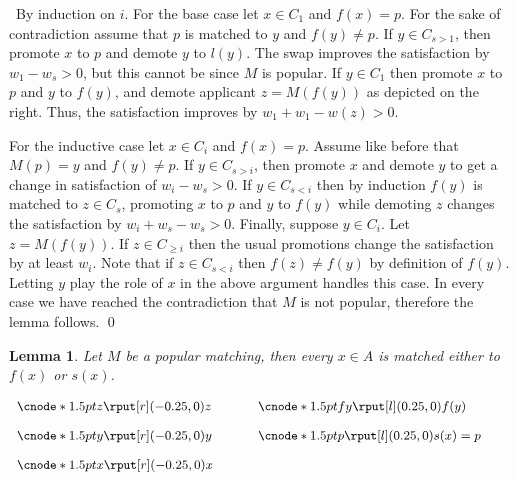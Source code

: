 \documentclass[11pt]{article}
\newcommand{\first}{f}
\newcommand{\second}{s}
\newtheorem{lemma}{Lemma}
\begin{document}
\newcommand\myproof{ ~}
\myproof By induction on $i$. For the base case let $x \in C_1$ and $\first(x)=p$. For the sake of contradiction assume that $p$ is matched to $y$ and $\first(y) \neq p$. If $y \in C_{s>1}$, then promote $x$ to $p$ and demote $y$ to $l(y)$. The swap improves the satisfaction by $w_1 - w_s > 0$, but this cannot be since $M$ is popular. If $y \in C_1$ then promote $x$ to $p$ and $y$ to $\first(y)$, and demote applicant $z = M(\first(y))$ as depicted on the right. Thus, the satisfaction improves by $w_1 + w_1 - w(z) > 0$. 

For the inductive case let $x \in C_i$ and $\first(x) = p$. Assume like before that $M(p)=y$ and $\first(y) \neq p$. If $y \in C_{s>i}$, then promote $x$ and demote $y$ to get a change in satisfaction of $w_i - w_s > 0$. If $y \in C_{s<i}$ then by induction $\first(y)$ is matched to $z \in C_s$, promoting $x$ to $p$ and  $y$ to $\first(y)$ while demoting $z$ changes the satisfaction by $w_i + w_s - w_s > 0$. Finally, suppose $y \in C_i$. Let $z = M(\first(y))$. If $z \in C_{\geq  i}$ then the usual promotions change the satisfaction by at least $w_i$. Note that if $z \in C_ {s < i}$ then $\first(z) \neq \first(y)$ by definition of $\first(y)$. Letting $y$ play the role of $x$ in the above argument handles this case.
In every case we have reached the contradiction that $M$ is not popular, therefore the lemma follows.
\qed \\

\begin{lemma} \label{lemma:second} Let $M$ be a popular matching, then every $x \in A$ is matched either to $\first(x)$ or $\second(x)$.
\end{lemma}

\begin{floatingfigure}[r]{3.75cm}
\vspace{1ex}\(\small \begin{array}{l@{\hspace{3.5em}}l}
 \cnode*{1.5pt}{z} \rput[r](-0.25,0){z}  & \cnode*{1.5pt}{fy} \rput[l](0.25,0){\first(y)} \\[0.35cm]
\cnode*{1.5pt}{y} \rput[r](-0.25,0){y}  & \cnode*{1.5pt}{p} \rput[l](0.25,0){\second(x) = p } \\[0.35cm]
\cnode*{1.5pt}{x} \rput[r](-0.25,0){x} \\[7em]
\end{array}\)
\end{floatingfigure}
\end{document}

